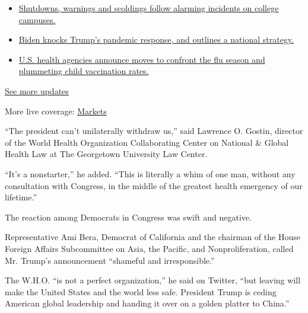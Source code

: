 \begin{itemize}
\tightlist
\item
  \href{https://www.nytimes3xbfgragh.onion/2020/08/20/world/coronavirus-covid.html?action=click\&pgtype=Article\&state=default\&region=MAIN_CONTENT_1\&context=storylines_live_updates\#link-68774d88}{Shutdowns,
  warnings and scoldings follow alarming incidents on college campuses.}
\item
  \href{https://www.nytimes3xbfgragh.onion/2020/08/20/world/coronavirus-covid.html?action=click\&pgtype=Article\&state=default\&region=MAIN_CONTENT_1\&context=storylines_live_updates\#link-26b58724}{Biden
  knocks Trump's pandemic response, and outlines a national strategy.}
\item
  \href{https://www.nytimes3xbfgragh.onion/2020/08/20/world/coronavirus-covid.html?action=click\&pgtype=Article\&state=default\&region=MAIN_CONTENT_1\&context=storylines_live_updates\#link-4e542da3}{U.S.
  health agencies announce moves to confront the flu season and
  plummeting child vaccination rates.}
\end{itemize}

\href{https://www.nytimes3xbfgragh.onion/2020/08/20/world/coronavirus-covid.html?action=click\&pgtype=Article\&state=default\&region=MAIN_CONTENT_1\&context=storylines_live_updates}{See
more updates}

More live coverage:
\href{https://www.nytimes3xbfgragh.onion/live/2020/08/20/business/stock-market-today-coronavirus?action=click\&pgtype=Article\&state=default\&region=MAIN_CONTENT_1\&context=storylines_live_updates}{Markets}

``The president can't unilaterally withdraw us,'' said Lawrence O.
Gostin, director of the World Health Organization Collaborating Center
on National \& Global Health Law at The Georgetown University Law
Center.

``It's a nonstarter,'' he added. ``This is literally a whim of one man,
without any consultation with Congress, in the middle of the greatest
health emergency of our lifetime.''

The reaction among Democrats in Congress was swift and negative.

Representative Ami Bera, Democrat of California and the chairman of the
House Foreign Affairs Subcommittee on Asia, the Pacific, and
Nonproliferation, called Mr. Trump's announcement ``shameful and
irresponsible.''

The W.H.O. ``is not a perfect organization,'' he said on Twitter, ``but
leaving will make the United States and the world less safe. President
Trump is ceding American global leadership and handing it over on a
golden platter to China.''

